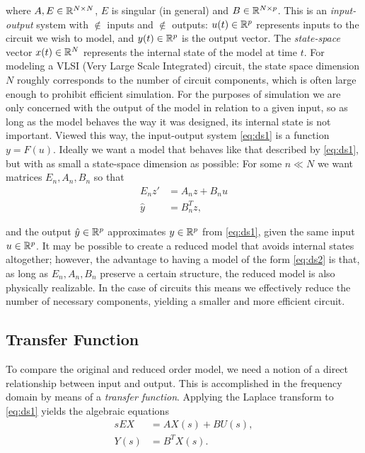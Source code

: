 \documentclass[letterpaper]{article}
\theoremstyle{remark}
\begin{document}
\begin{description}
	 where $A,E\in\mathbb{R}^{N\times N}$, $E$ is singular (in general) and 
	 $B\in\mathbb{R}^{N\times p}$. This is an 
	 \emph{input-output} system with $\nin$ inputs and $\nin$ outputs:  $u(t)\in\mathbb{R}^p$ 
	 represents inputs to the circuit we wish to model, and $y(t)\in\mathbb{R}^p$ is the output
	 vector.  The \emph{state-space}
	 vector $x(t)\in\mathbb{R}^N$ represents the internal state of the model at time $t$.  For
	 modeling a VLSI (Very Large Scale Integrated) circuit, the state space dimension $N$ 
	 roughly corresponds to the number
	 of circuit components, which is often large enough to prohibit efficient simulation.  
	 For the purposes of simulation we are only concerned with the output of the model in 
	 relation to a given input, so as long as the model behaves the way it was designed, 
	 its internal state is not important. Viewed this way, the input-output system 
	 \eqref{eq:ds1} is a function $y = F(u)$.
	 Ideally we want a model that behaves like that described 
	 by \eqref{eq:ds1}, but with as small a state-space dimension as possible:  
	 For some $n\ll N$ we want matrices $E_n, A_n, B_n$ so that 
	 \begin{equation}
	 \begin{aligned}
		E_nz' &= A_nz + B_nu\\
		\hat{y} &= B_n^Tz,
	\end{aligned}
	\label{eq:ds2}
	\end{equation}

	 and the output $\hat{y}\in\mathbb{R}^p$ approximates $y\in\mathbb{R}^p$ from \eqref{eq:ds1}, 
	 given the same input $u\in\mathbb{R}^p$.  It may be possible to create a reduced model that
	 avoids
	 internal states altogether; however, the advantage to having a model of the form 
	 \eqref{eq:ds2} is that, as long as $E_n, A_n, B_n$ preserve a certain structure, 
	 the reduced model is also physically realizable.  In the case of circuits this means 
	 we effectively reduce the number of necessary components, yielding a smaller and more
	 efficient circuit.

	\subsection{Transfer Function}
	
	To compare the original and reduced order model, we need a notion of a direct 
	relationship between input and output.  This is accomplished in the frequency
	domain 
	by means of a \emph{transfer function}.  Applying the Laplace transform to  
	\eqref{eq:ds1}
	yields the algebraic equations 
	 \begin{equation*}
			 \begin{aligned}
				sEX &=  AX(s) + BU(s),\\
				Y(s) &= B^TX(s).
			\end{aligned}
	\end{equation*}


\end{description}
\end{document}

